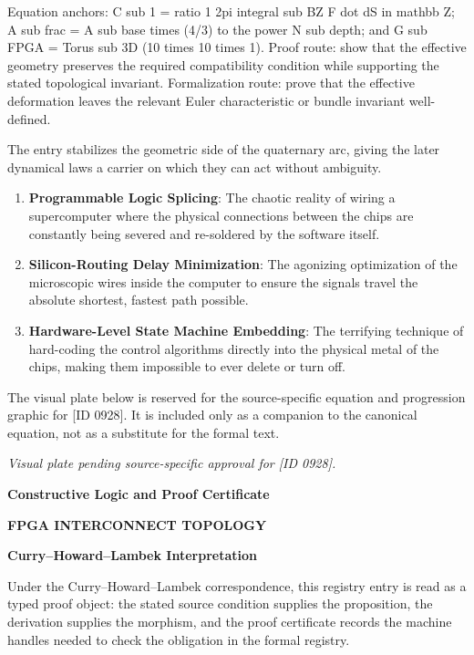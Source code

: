Equation anchors: C sub 1 = ratio 1 2pi integral sub BZ F dot dS in mathbb Z; A sub frac = A sub base times (4/3) to the power N sub depth; and G sub FPGA = Torus sub 3D (10 times 10 times 1). Proof route: show that the effective geometry preserves the required compatibility condition while supporting the stated topological invariant. Formalization route: prove that the effective deformation leaves the relevant Euler characteristic or bundle invariant well-defined.

The entry stabilizes the geometric side of the quaternary arc, giving the later dynamical laws a carrier on which they can act without ambiguity.
\endgroup

\begin{enumerate}[leftmargin=1.6em,itemsep=6pt,topsep=4pt]
\item \textbf{Programmable Logic Splicing}: The chaotic reality of wiring a supercomputer where the physical connections between the chips are constantly being severed and re-soldered by the software itself.
\item \textbf{Silicon-Routing Delay Minimization}: The agonizing optimization of the microscopic wires inside the computer to ensure the signals travel the absolute shortest, fastest path possible.
\item \textbf{Hardware-Level State Machine Embedding}: The terrifying technique of hard-coding the control algorithms directly into the physical metal of the chips, making them impossible to ever delete or turn off.
\end{enumerate}

\begingroup\footnotesize\sloppy
The visual plate below is reserved for the source-specific equation and progression graphic for [ID 0928]. It is included only as a companion to the canonical equation, not as a substitute for the formal text.
\par\endgroup
\begingroup\footnotesize\itshape
Visual plate pending source-specific approval for [ID 0928].
\par\endgroup

\clearpage
\begingroup\tzpsupportsetup
\noindent\textbf{\fontsize{10.8pt}{12.8pt}\selectfont [ID 0928] Constructive Logic and Proof Certificate}\par
\noindent\textbf{\fontsize{10pt}{12pt}\selectfont FPGA INTERCONNECT TOPOLOGY}\par
\vspace{0.45em}
\begingroup
\footnotesize
\setlength{\parskip}{0.22em}
\setlength{\parindent}{0pt}
\noindent\textbf{Curry--Howard--Lambek Interpretation}\par
Under the Curry--Howard--Lambek correspondence, this registry entry is read as a typed proof
object: the stated source condition supplies the proposition, the derivation supplies the
morphism, and the proof certificate records the machine handles needed to check the obligation
in the formal registry.

